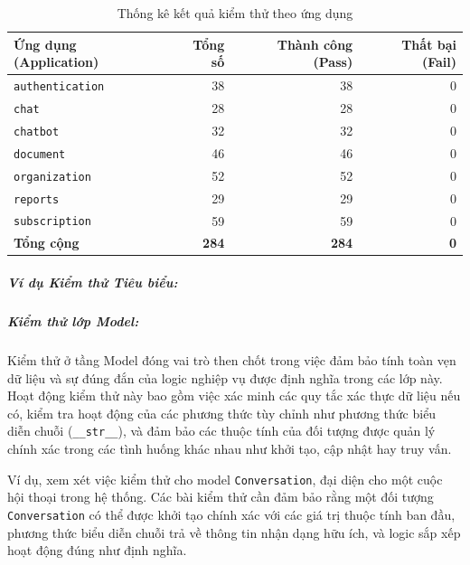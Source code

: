 \begin{table}[htbp]
    \centering
    \caption{Thống kê kết quả kiểm thử theo ứng dụng}
    \label{tab:test_statistics_detailed}
    \begin{tabular}{lrrr}
        \toprule
        \textbf{Ứng dụng (Application)} & \textbf{Tổng số} & \textbf{Thành công (Pass)} & \textbf{Thất bại (Fail)} \\
        \midrule
        \texttt{authentication} &  38 &  38 & 0 \\
        \texttt{chat}           &  28 &  28 & 0 \\
        \texttt{chatbot}        &  32 &  32 & 0 \\
        \texttt{document}       &  46 &  46 & 0 \\
        \texttt{organization}   &  52 &  52 & 0 \\
        \texttt{reports}        &  29 &  29 & 0 \\
        \texttt{subscription}   &  59 &  59 & 0 \\
        \midrule
        \textbf{Tổng cộng}      & \textbf{284} & \textbf{284} & \textbf{0} \\
        \bottomrule
    \end{tabular}
\end{table}


\subparagraph{Ví dụ Kiểm thử Tiêu biểu: }



\subparagraph{Kiểm thử lớp Model: }



Kiểm thử ở tầng Model đóng vai trò then chốt trong việc đảm bảo tính toàn vẹn dữ liệu và sự đúng đắn của logic nghiệp vụ được định nghĩa trong các lớp này. Hoạt động kiểm thử này bao gồm việc xác minh các quy tắc xác thực dữ liệu nếu có, kiểm tra hoạt động của các phương thức tùy chỉnh như phương thức biểu diễn chuỗi (\texttt{\_\_str\_\_}), và đảm bảo các thuộc tính của đối tượng được quản lý chính xác trong các tình huống khác nhau như khởi tạo, cập nhật hay truy vấn.

Ví dụ, xem xét việc kiểm thử cho model \texttt{Conversation}, đại diện cho một cuộc hội thoại trong hệ thống. Các bài kiểm thử cần đảm bảo rằng một đối tượng \texttt{Conversation} có thể được khởi tạo chính xác với các giá trị thuộc tính ban đầu, phương thức biểu diễn chuỗi trả về thông tin nhận dạng hữu ích, và logic sắp xếp hoạt động đúng như định nghĩa.

